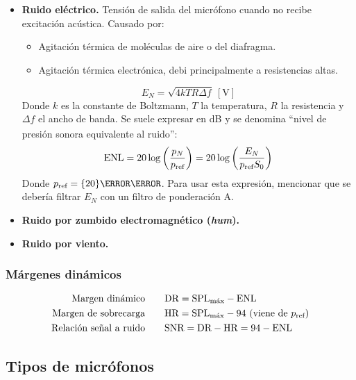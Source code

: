 \documentclass[a4paper, 8pt]{extarticle}
\begin{document}
\begin{multicols}{3}
  \begin{itemize}
    \item \textbf{Ruido eléctrico.} Tensión de salida del micrófono cuando no recibe excitación acústica. Causado por:
          \begin{itemize}
            \item Agitación térmica de moléculas de aire o del diafragma.
            \item Agitación térmica electrónica, debi principalmente a resistencias altas.
          \end{itemize}
          \[ E_N = \sqrt{4kTR \Delta f} \ \left[ \unit{\volt }  \right]\]
          Donde $k$ es la constante de Boltzmann, $T$ la temperatura, $R$ la resistencia y $\Delta f$ el ancho de banda. Se suele expresar en \unit{\dB_{}} y se denomina ``nivel de presión sonora equivalente al ruido'':
          \[ \text{ENL} = 20 \log \left( \frac{p_N}{p _{\textnormal{ref}}} \right)  = 20 \log \left( \frac{E_N}{p _{\textnormal{ref}}S_0} \right) \]
          Donde $p _{\textnormal{ref}} = \qty{20}{\micro\pascal }$. Para usar esta expresión, mencionar que se debería filtrar $E_N$ con un filtro de ponderación A.
    \item \textbf{Ruido por zumbido electromagnético (\textit{hum}).}
    \item \textbf{Ruido por viento.}
  \end{itemize}

  \subsubsection{Márgenes dinámicos}

  \begin{align*}
    \text{Margen dinámico}        & \qquad \text{DR} = \text{SPL}_{\text{máx}} - \text{ENL}                                    \\
    \text{Margen de sobrecarga}   & \qquad \text{HR} = \text{SPL}_{\text{máx}} - 94 \ (\text{viene de } p _{\textnormal{ref}}) \\
    \text{Relación señal a ruido} & \qquad \text{SNR} = \text{DR} - \text{HR} = 94 - \text{ENL}
  \end{align*}
  \color{black}\xspace
  \subsection{Tipos de micrófonos}

\end{multicols}
\end{document}

